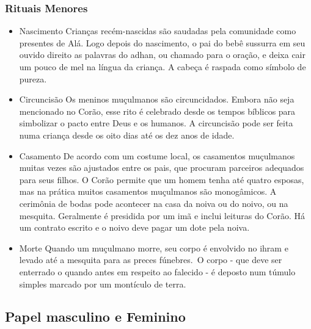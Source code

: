 \documentclass[12pt]{article}
\begin{document}
\subsubsection{Rituais Menores}
\begin{itemize}
    \item Nascimento
    Crianças recém-nascidas são saudadas pela comunidade como presentes de Alá. Logo depois do nascimento, o pai do bebê sussurra em seu ouvido direito as palavras do adhan, ou chamado para o oração, e deixa cair um pouco de mel na língua da criança. A cabeça é raspada como símbolo de pureza.
    \item Circuncisão
    Os meninos muçulmanos são circuncidados. Embora não seja mencionado no Corão, esse rito é celebrado desde os tempos bíblicos para simbolizar o pacto entre Deus e os humanos. A circuncisão pode ser feita numa criança desde os oito dias até os dez anos de idade.    
    \item Casamento
    De acordo com um costume local, os casamentos muçulmanos muitas vezes são ajustados entre os pais, que procuram parceiros adequados para seus filhos. O Corão permite que um homem tenha até quatro esposas, mas na prática muitos casamentos muçulmanos são monogâmicos. A cerimônia de bodas pode acontecer na casa da noiva ou do noivo, ou na mesquita. Geralmente é presidida por um imã e inclui leituras do Corão. Há um contrato escrito e o noivo deve pagar um dote pela noiva.    
    \item Morte
    Quando um muçulmano morre, seu corpo é envolvido no ihram e levado até a mesquita para as preces fúnebres. O corpo - que deve ser enterrado o quando antes em respeito ao falecido - é deposto num túmulo simples marcado por um montículo de terra.    
\end{itemize}

\subsection{Papel masculino e Feminino}
\end{document}
